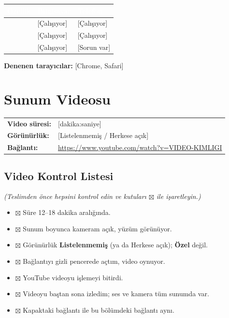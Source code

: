 \documentclass[12pt,a4paper]{article}
\newcommand{\aciklama}[1]{{\color{gray}\itshape (#1)}}
\newcommand{\youtubelink}{\url{https://www.youtube.com/watch?v=VIDEO-KIMLIGI}}
\begin{document}
\begin{center}
\begin{tabular}{@{}p{6cm}p{3.4cm}p{3.4cm}@{}}
\toprule
\rowcolor{ana}\textcolor{white}{\textbf{Özellik}} & \textcolor{white}{\textbf{Bilgisayar}} & \textcolor{white}{\textbf{Telefon}} \\
\midrule
{} & [Çalışıyor] & [Çalışıyor] \\
 & [Çalışıyor] & [Çalışıyor] \\
 & [Çalışıyor] & [Sorun var] \\
\bottomrule
\end{tabular}
\end{center}

\textbf{Denenen tarayıcılar:} [Chrome, Safari]

\section{Sunum Videosu}
\begin{center}
\begin{tabular}{@{}ll@{}}
\textbf{Video süresi:} & [dakika:saniye] \quad \aciklama{12--18 dakika olmalıdır} \\
\textbf{Görünürlük:} & [Listelenmemiş / Herkese açık] \\
\textbf{Bağlantı:} & \youtubelink \\
\end{tabular}
\end{center}

\subsection{Video Kontrol Listesi}
\aciklama{Teslimden önce hepsini kontrol edin ve kutuları $\boxtimes$ ile işaretleyin.}
\begin{itemize}[label={}]
  \item $\boxtimes$ Süre 12--18 dakika aralığında.
  \item $\boxtimes$ Sunum boyunca kameram açık, yüzüm görünüyor.
  \item $\boxtimes$ Görünürlük \textbf{Listelenmemiş} (ya da Herkese açık); \textbf{Özel} değil.
  \item $\boxtimes$ Bağlantıyı gizli pencerede açtım, video oynuyor.
  \item $\boxtimes$ YouTube videoyu işlemeyi bitirdi.
  \item $\boxtimes$ Videoyu baştan sona izledim; ses ve kamera tüm sunumda var.
  \item $\boxtimes$ Kapaktaki bağlantı ile bu bölümdeki bağlantı aynı.
\end{itemize}
\end{document}
